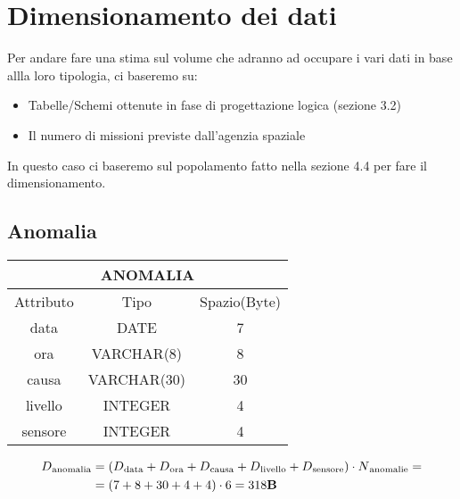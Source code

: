 \section{Dimensionamento dei dati}
Per andare fare una stima sul volume che adranno ad occupare i vari dati in base allla loro tipologia, ci baseremo su:
\begin{itemize}
\item Tabelle/Schemi ottenute in fase di progettazione logica (sezione 3.2)
\item Il numero di missioni previste dall'agenzia spaziale
\end{itemize}
In questo caso ci baseremo sul popolamento fatto nella sezione 4.4 per fare il dimensionamento.
\subsection{Anomalia}
\begin{tabular}{|c|c|c|}
  \hline
  \multicolumn{3}{|c|}{\textbf{ANOMALIA}}\\
  \hline
  Attributo & Tipo & Spazio(Byte) \\
  \hline
  data & DATE & 7 \\
  ora & VARCHAR(8)  & 8 \\
  causa & VARCHAR(30) & 30 \\
  livello & INTEGER & 4 \\
  sensore & INTEGER & 4 \\
  \hline
\end{tabular}
\begin{equation}
  \begin{aligned}
    D{\text{\textsubscript{anomalia}}}&=(D{\text{\textsubscript{data}}} + D{\text{\textsubscript{ora}}} +D{\text{\textsubscript{causa}}} +D{\text{\textsubscript{livello}}} + D{\text{\textsubscript{sensore}}}) \cdot N{\text{\textsubscript{anomalie}}}=\\
    &=(7+8+30+4+4)\cdot 6 = 318\text{\textbf{B}}\\
  \end{aligned}
\end{equation}
